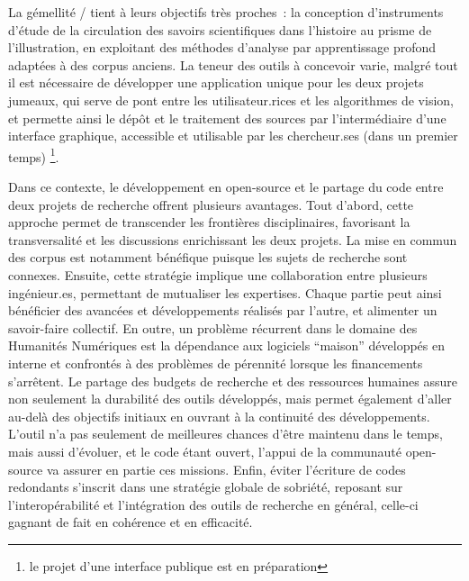 La gémellité \eida / \vhs tient à leurs objectifs très proches~: la
conception d'instruments d'étude de la circulation des savoirs
scientifiques dans l'histoire au prisme de l'illustration, en exploitant
des méthodes d'analyse par apprentissage profond adaptées à des corpus
anciens. La teneur des outils à concevoir varie, malgré tout il est
nécessaire de développer une application unique pour les deux projets
jumeaux, qui serve de pont entre les utilisateur.rices et les algorithmes de
vision, et permette ainsi le dépôt et le traitement des sources par
l'intermédiaire d'une interface graphique, accessible et utilisable par
les chercheur.ses (dans un premier temps) \footnote{le projet d'une
  interface publique est en préparation}.

Dans ce contexte, le développement en open-source et le partage du code
entre deux projets de recherche offrent plusieurs avantages. Tout
d'abord, cette approche permet de transcender les frontières
disciplinaires, favorisant la transversalité et les discussions
enrichissant les deux projets. La mise en commun des corpus est
notamment bénéfique puisque les sujets de recherche sont connexes.
Ensuite, cette stratégie implique une collaboration entre plusieurs
ingénieur.es, permettant de mutualiser les expertises. Chaque partie peut
ainsi bénéficier des avancées et développements réalisés par l'autre, et
alimenter un savoir-faire collectif. En outre, un problème récurrent
dans le domaine des Humanités Numériques est la dépendance aux logiciels
``maison'' développés en interne et confrontés à des problèmes de
pérennité lorsque les financements s'arrêtent. Le partage des budgets de
recherche et des ressources humaines assure non seulement la durabilité
des outils développés, mais permet également d'aller au-delà des
objectifs initiaux en ouvrant à la continuité des développements.
L'outil n'a pas seulement de meilleures chances d'être maintenu dans le
temps, mais aussi d'évoluer, et le code étant ouvert, l'appui de la
communauté open-source va assurer en partie ces missions. Enfin, éviter
l'écriture de codes redondants s'inscrit dans une stratégie globale de
sobriété, reposant sur l'interopérabilité et l'intégration des outils de
recherche en général, celle-ci gagnant de fait en cohérence et en
efficacité.

